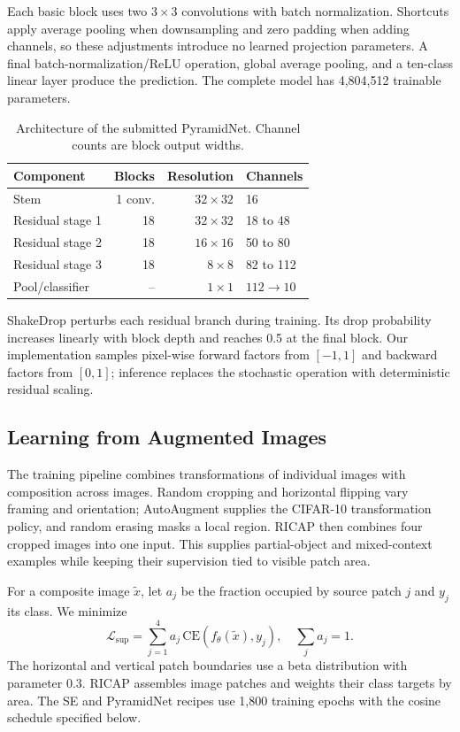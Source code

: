 \documentclass[letterpaper]{article} %
\begin{document}
Each basic block uses two $3\times3$ convolutions with batch normalization. Shortcuts apply average pooling when downsampling and zero padding when adding channels, so these adjustments introduce no learned projection parameters. A final batch-normalization/ReLU operation, global average pooling, and a ten-class linear layer produce the prediction. The complete model has 4,804,512 trainable parameters.

\begin{table}[tb]
\centering\small
\begin{tabular}{lrrl}
\toprule
Component & Blocks & Resolution & Channels\\
\midrule
Stem & 1 conv. & $32\times32$ & 16\\
Residual stage 1 & 18 & $32\times32$ & 18 to 48\\
Residual stage 2 & 18 & $16\times16$ & 50 to 80\\
Residual stage 3 & 18 & $8\times8$ & 82 to 112\\
Pool/classifier & -- & $1\times1$ & $112\rightarrow10$\\
\bottomrule
\end{tabular}
\caption{Architecture of the submitted PyramidNet. Channel counts are block output widths.}
\label{tab:architecture}
\end{table}

ShakeDrop \cite{shakedrop} perturbs each residual branch during training. Its drop probability increases linearly with block depth and reaches 0.5 at the final block. Our implementation samples pixel-wise forward factors from $[-1,1]$ and backward factors from $[0,1]$; inference replaces the stochastic operation with deterministic residual scaling.

\subsection{Learning from Augmented Images}
The training pipeline combines transformations of individual images with composition across images. Random cropping and horizontal flipping vary framing and orientation; AutoAugment supplies the CIFAR-10 transformation policy, and random erasing masks a local region. RICAP then combines four cropped images into one input. This supplies partial-object and mixed-context examples while keeping their supervision tied to visible patch area.

For a composite image $\widetilde{x}$, let $a_j$ be the fraction occupied by source patch $j$ and $y_j$ its class. We minimize
\begin{equation}
 \mathcal L_{\mathrm{sup}}=\sum_{j=1}^{4}a_j\,\mathrm{CE}(f_\theta(\widetilde{x}),y_j),
 \quad \sum_j a_j=1.
\end{equation}
The horizontal and vertical patch boundaries use a beta distribution with parameter 0.3. RICAP assembles image patches and weights their class targets by area. The SE and PyramidNet recipes use 1,800 training epochs with the cosine schedule specified below.
\end{document}

